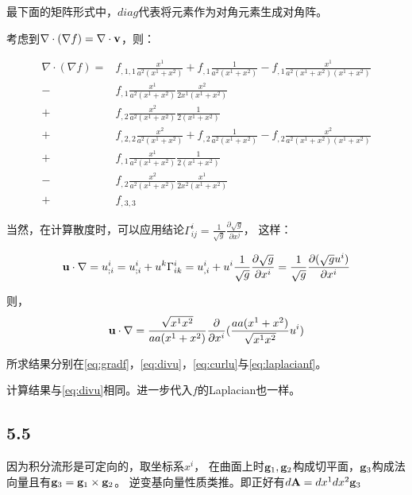 \documentclass[UTF8,zihao=5]{ctexart}
\newcommand{\bm}[1]{{\mathbf{#1}}}
\newcommand*{\pd}[2]{\frac{\partial #1}{\partial #2}}
\begin{document}
最下面的矩阵形式中，$diag$代表将元素作为对角元素生成对角阵。

考虑到$\nabla\cdot(\nabla f)=\nabla\cdot\vv$，则：

\begin{equation}
    \begin{aligned}
        \nabla\cdot(\nabla f)
        = &
        f_{,1,1}\frac{x^1}{a^2(x^1+x^2)} + f_{,1}\frac{1}{a^2(x^1+x^2)} -f_{,1}\frac{x^1}{a^2(x^1+x^2)(x^1+x^2)} \\
        - & f_{,1}\frac{x^1}{a^2(x^1+x^2)} \frac{x^2}{2x^1(x^1+x^2)}                                             \\
        + & f_{,2}\frac{x^2}{a^2(x^1+x^2)} \frac{1}{2(x^1+x^2)}                                                  \\
        + &
        f_{,2,2}\frac{x^2}{a^2(x^1+x^2)} + f_{,2}\frac{1}{a^2(x^1+x^2)}- f_{,2}\frac{x^2}{a^2(x^1+x^2)(x^1+x^2)} \\
        + & f_{,1}\frac{x^1}{a^2(x^1+x^2)} \frac{1}{2(x^1+x^2)}                                                  \\
        - & f_{,2}\frac{x^2}{a^2(x^1+x^2)} \frac{x^1}{2x^2(x^1+x^2)}                                             \\
        + &
        f_{,3,3}
    \end{aligned}
    \label{eq:laplacianf}
\end{equation}


当然，在计算散度时，可以应用结论$\Gamma^i_{ij}=\frac{1}{\sqrt{g}}\pd{\sqrt{g}}{x^j}$，
这样：

$$
    \uu\cdot\nb = u^i_{;i}=u^i_{;i} + u^k\Gamma^i_{ik}=
    u^i_{,i} + u^i\frac{1}{\sqrt{g}}\pd{\sqrt{g}}{x^i}
    =\frac{1}{\sqrt{g}}\pd{(\sqrt{g}u^i)}{x^i}
$$

则，
$$
    \uu\cdot\nb
    =
    \frac{\sqrt{x^1x^2}}{aa(x^1+x^2)}
    \pd{}{x^i}(\frac{aa(x^1+x^2)}{\sqrt{x^1x^2}}u^i)
$$

所求结果分别在\eqref{eq:gradf}，\eqref{eq:divu}，\eqref{eq:curlu}与\eqref{eq:laplacianf}。

计算结果与\eqref{eq:divu}相同。进一步代入$f$的Laplacian也一样。



\subsection*{5.5}

因为积分流形是可定向的，取坐标系$x^i$，
在曲面上时$\g_1,\g_2$构成切平面，$\g_3$构成法向量且有$\g_3 = \g_1\times\g_2$。
逆变基向量性质类推。即正好有$d\bm{A}=dx^1dx^2\g_3$
\end{document}
